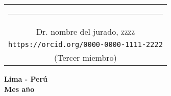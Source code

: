 \vspace*{1.0cm}

\begin{center}
  \begin{tabular}{c}
    {\footnotesize \rule{7cm}{0.0009cm}} \\
    {\footnotesize Dr. nombre del jurado, \textsc{zzzz}} \\
    {\footnotesize \texttt{https://orcid.org/0000-0000-1111-2222}} \\
    {\footnotesize (Tercer miembro)}
  \end{tabular}
\end{center}

\vspace*{1.0cm}

\begin{center}
  {
    \baselineskip=10pt
    \textbf{Lima - Per\'u} \\
    \textbf{Mes a\~no}
  }
\end{center}
